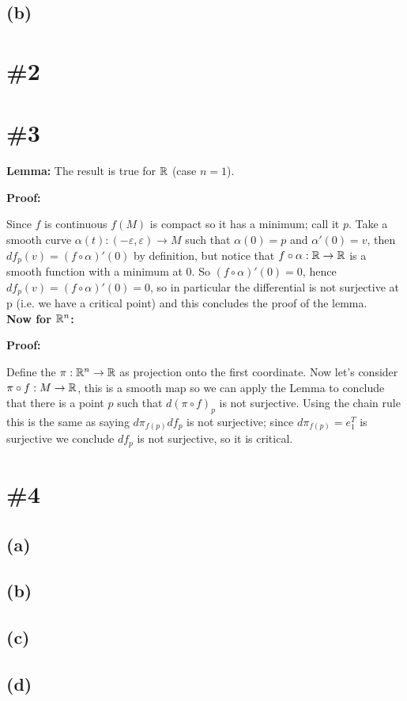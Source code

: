 \documentclass{article}
\begin{document}
\subsection*{(b)}
\section*{\#2}
\section*{\#3}
\textbf{Lemma:} The result is true for $\mathbb{R}$ (case $n=1$).

\textbf{Proof:}

	Since $f$ is continuous $f(M)$ is compact so
	it has a minimum; call it $p$. Take a smooth
	curve
	$\alpha(t):(-\varepsilon,\varepsilon)\to M$
	such that $\alpha(0)=p$ and $\alpha'(0)=v$,
	then $df_p(v)=(f\circ \alpha)'(0)$ by
	definition, but notice that $f\circ\alpha:\mathbb{R}
	\to\mathbb{R}$ is a smooth function with a minimum at
	0. So $(f\circ \alpha)'(0)=0$, hence
	$df_p(v)=(f\circ \alpha)'(0)=0$, so in
	particular the differential is not surjective
	at p (i.e. we have a critical point) and this
	concludes the proof of the lemma.\\
	\textbf{Now for $\mathbb{R}^n$:}

\textbf{Proof:}

	Define the $\pi:\mathbb{R}^n\to\mathbb{R}$ as projection onto
	the first coordinate. Now let's consider
	$\pi\circ f:M\to\mathbb{R}$, this is a smooth map so
	we can apply the Lemma to conclude that there
	is a point $p$ such that $d(\pi\circ f)_p$ is
	not surjective. Using the chain rule this is
	the same as saying $d\pi_{f(p)}df_p$ is not
	surjective; since $d\pi_{f(p)}=e_1^T$ is
	surjective we conclude $df_p$ is not
	surjective, so it is critical.

\section*{\#4}
\subsection*{(a)}
\subsection*{(b)}
\subsection*{(c)}
\subsection*{(d)}
\end{document}
